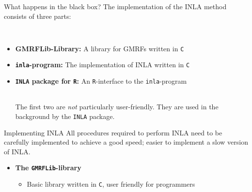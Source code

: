 \documentclass[
  handout]{beamer}
\providecommand{\tightlist}{%
  \setlength{\itemsep}{0pt}\setlength{\parskip}{0pt}}
\begin{document}
\begin{frame}[fragile]{What happens in the black box?}
\protect\hypertarget{what-happens-in-the-black-box}{}
The implementation of the INLA method consists of three parts:\\
\strut \\

\begin{itemize}
\item
  \textbf{GMRFLib-Library:} A library for GMRFs written in \texttt{C}
\item
  \textbf{\texttt{inla}-program:} The implementation of INLA written in
  \texttt{C}
\item
  \textbf{\texttt{INLA} package for \texttt{R}:} An \texttt{R}-interface
  to the \texttt{inla}-program\\
  \strut \\
  The first two are \emph{not} particularly user-friendly. They are used
  in the background by the \texttt{INLA} package.
\end{itemize}
\end{frame}

\begin{frame}[fragile]{Implementing INLA}
\protect\hypertarget{implementing-inla}{}
All procedures required to perform INLA need to be carefully implemented
to achieve a good speed; easier to implement a slow version of INLA.

\pause

\begin{itemize}
\item
  \textbf{The \texttt{GMRFLib}-library}

  \begin{itemize}
  \tightlist
  \item
    Basic library written in \texttt{C}, user friendly for programmers
  \end{itemize}
\end{itemize}
\end{frame}
\end{document}
